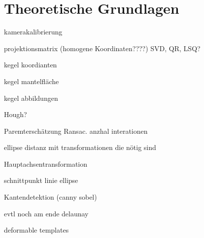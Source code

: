 \chapter{Theoretische Grundlagen}



kamerakalibrierung

projektionsmatrix
(homogene Koordinaten????)
SVD, QR, LSQ?

kegel koordianten

kegel mantelfläche

kegel abbildungen

Hough?

Paremterschätzung Ransac. anzhal interationen

ellipse distanz mit transformationen die nötig sind

Hauptachsentransformation

schnittpunkt linie ellipse


Kantendetektion (canny sobel)


evtl noch am ende delaunay

deformable templates